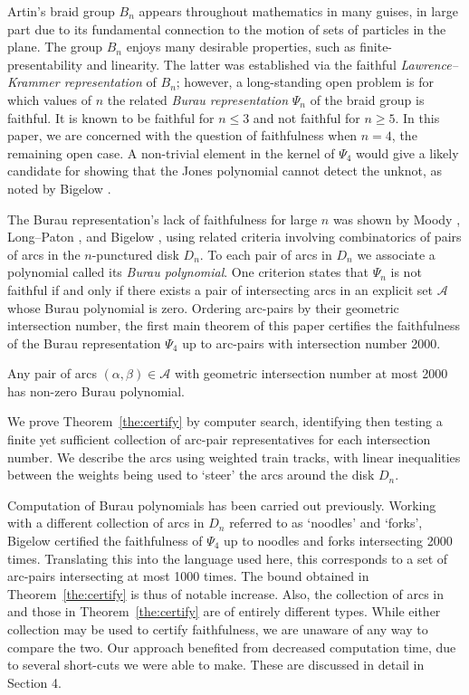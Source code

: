 Artin's braid group $B_n$ appears throughout mathematics in many guises, in large part due to its fundamental connection to the motion of sets of particles in the plane. The group $B_n$ enjoys many desirable properties, such as finite-presentability and linearity. The latter was established via the faithful \emph{Lawrence--Krammer representation} of $B_n$; however, a long-standing open problem is for which values of $n$ the related \emph{Burau representation} $\Psi_n$ of the braid group is faithful. It is known to be faithful for $n \leq 3$ and not faithful for $n \geq 5$. In this paper, we are concerned with the question of faithfulness when $n=4$, the remaining open case. A non-trivial element in the kernel of $\Psi_4$ would give a likely candidate for showing that the Jones polynomial cannot detect the unknot, as noted by Bigelow \cite{Big02}.

The Burau representation's lack of faithfulness for large $n$ was shown by Moody \cite{Moo91}, Long--Paton \cite{LP93}, and Bigelow \cite{Big99}, using related criteria involving combinatorics of pairs of arcs in the $n$-punctured disk $D_n$. To each pair of arcs in $D_n$ we associate a polynomial called its \emph{Burau polynomial}. One criterion states that $\Psi_n$ is not faithful if and only if there exists a pair of intersecting arcs in an explicit set $\mathcal{A}$ whose Burau polynomial is zero. Ordering arc-pairs by their geometric intersection number, the first main theorem of this paper certifies the faithfulness of the Burau representation $\Psi_4$ up to arc-pairs with intersection number 2000.

\begin{maintheorem}\label{the:certify}Any pair of arcs $(\alpha, \beta) \in \mathcal{A}$ with geometric intersection number at most 2000 has non-zero Burau polynomial.
\end{maintheorem} 

We prove Theorem~\ref{the:certify} by computer search, identifying then testing a finite yet sufficient collection of arc-pair representatives for each intersection number. We describe the arcs using weighted train tracks, with linear inequalities between the weights being used to `steer' the arcs around the disk $D_n$.

Computation of Burau polynomials has been carried out previously. Working with a different collection of arcs in $D_n$ referred to as `noodles' and `forks', Bigelow \cite{Big02} certified the faithfulness of $\Psi_4$ up to noodles and forks intersecting 2000 times. Translating this into the language used here, this corresponds to a set of arc-pairs intersecting at most 1000 times. The bound obtained in Theorem~\ref{the:certify} is thus of notable increase. Also, the collection of arcs in \cite{Big02} and those in Theorem~\ref{the:certify} are of entirely different types. While either collection may be used to certify faithfulness, we are unaware of any way to compare the two.  Our approach benefited from decreased computation time, due to several short-cuts we were able to make. These are discussed in detail in Section 4.

